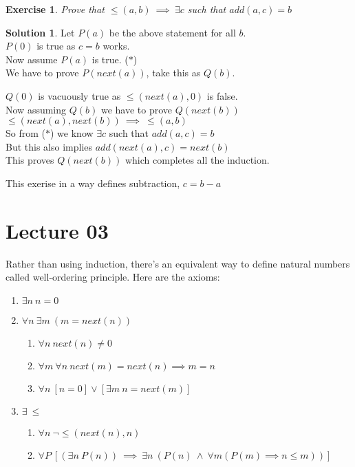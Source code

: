 \documentclass[a4paper,10pt]{article}
\newtheorem{exercise}{Exercise}[section]
\theoremstyle{definition} %
\newtheorem*{solution}{Solution}
\begin{document}
    \newpage
    \begin{exercise}
        Prove that $\leq(a,b) \ \implies \ \exists c$ such that $add(a,c) = b$
    \end{exercise}
    \begin{solution}
        Let $P(a)$ be the above statement for all $b$. \\
        $P(0)$ is true as $c = b$ works. \\ 
        Now assume $P(a)$ is true. \quad ($\ast$) \\
        We have to prove $P(next(a))$, take this as $Q(b)$.
        \begin{adjustwidth}{1cm}{0cm}
            $Q(0)$ is vacuously true as $\leq(next(a), 0)$ is false. \\
            Now assuming $Q(b)$ we have to prove $Q(next(b))$ \\
            $\leq(next(a), next(b)) \ \implies \ \leq(a,b)$ \\
            So from ($\ast$) we know $\exists c$ such that $add(a,c) = b$ \\
            But this also implies $add(next(a), c) = next(b)$ \\
            This proves $Q(next(b))$ which completes all the induction.
        \end{adjustwidth}
        This exerise in a way defines subtraction, $c = b-a$
    \end{solution}

    \section{Lecture 03}
    Rather than using induction, there's an equivalent way to define natural numbers called
    well-ordering principle. Here are the axioms:

    \begin{tcolorbox}[colback=blue!10!white, colframe=blue!50!black]
        \begin{enumerate}
            \item $\exists n \ n = 0$
            \item $\forall n \ \exists m \ (m = next(n))$
            \begin{enumerate}
                \item $\forall n \ next(n) \neq 0$
                \item $\forall m \ \forall n \ next(m) = next(n) \implies m = n$
                \item $\forall n \ [n = 0] \lor [\exists m \ n = next(m)]$
            \end{enumerate}
            \item $\exists \ \leq$
            \begin{enumerate}
                \item $\forall n \ \lnot \leq(next(n), n)$
                \item $\forall P \ [(\exists n \ P(n)) \ \implies \ \exists n \ (P(n) \ \land \ \forall m(P(m) \implies n \leq m))]$
            \end{enumerate}
        \end{enumerate}
    \end{tcolorbox}
\end{document}
